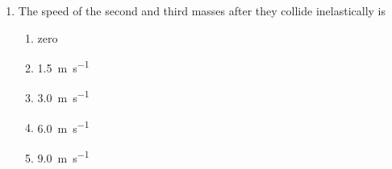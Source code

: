 \documentclass{../../../oss-apphys}
\begin{document}
\begin{multicols}{2}
\begin{enumerate}[leftmargin=18pt,resume]
  \item The speed of the second and third masses after they collide
    inelastically is
    \label{3masses2}
    \begin{enumerate}[nosep,leftmargin=18pt,label=(\Alph*)]
    \item zero
    \item\SI{1.5}{\metre\per\second}
    \item\SI{3.0}{\metre\per\second}
    \item\SI{6.0}{\metre\per\second}
    \item\SI{9.0}{\metre\per\second}
    \end{enumerate}
  \end{enumerate}
  

    

\end{multicols}
\end{document}
